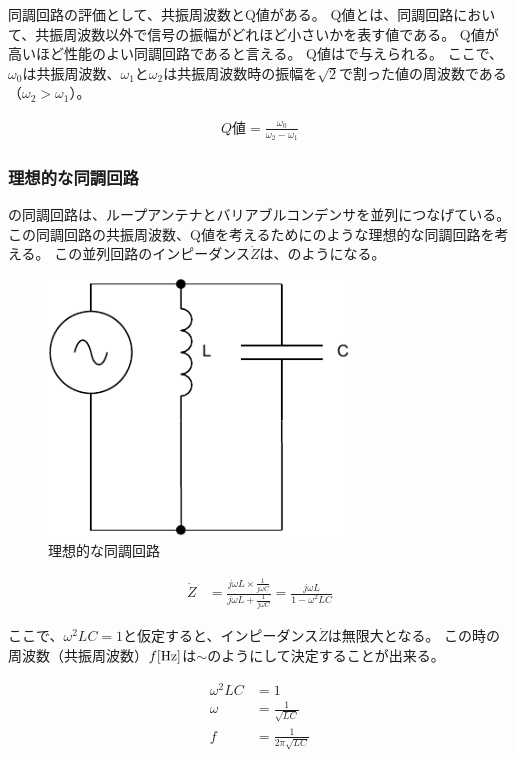 \documentclass[report.tex]{subfiles}
\begin{document}
同調回路の評価として、共振周波数とQ値がある。
Q値とは、同調回路において、共振周波数以外で信号の振幅がどれほど小さいかを表す値である。
Q値が高いほど性能のよい同調回路であると言える。
Q値はで与えられる\cite{ノート}。
ここで、\(\omega_0\)は共振周波数、\(\omega_1\)と\(\omega_2\)は共振周波数時の振幅を\(\sqrt{2}\)で割った値の周波数である（\(\omega_2 > \omega_1\)）。

\begin{align}
	Q値 =\frac{\omega_0}{\omega_2 - \omega_1} \label{eq:Q値}
\end{align}

\subsubsection{理想的な同調回路}

の同調回路は、ループアンテナとバリアブルコンデンサを並列につなげている。
この同調回路の共振周波数、Q値を考えるためにのような理想的な同調回路を考える。
この並列回路のインピーダンス\(\dot{Z}\)は、のようになる。

\begin{figure}[H]
	\centering
	\includegraphics[width=8cm]{fig/kyo.pdf}
	\caption{理想的な同調回路}
	\label{fig:kyo}
\end{figure}

\begin{align}
	\dot{Z} & = \frac{j \omega L \times \frac{1}{j \omega C}}{j \omega L + \frac{1}{j \omega C}} = \frac{j \omega L}{1 - \omega^2 LC} \label{eq:impedance}
\end{align}

ここで、$\omega^2 LC = 1$と仮定すると、インピーダンス\(\dot{Z}\)は無限大となる。
この時の周波数（共振周波数）\(f\rm{[Hz]}\)は\(\sim\)のようにして決定することが出来る。

\begin{align}
	\omega^2 LC & = 1                            \label{eq:resonance2} \\
	\omega      & = \frac{1}{\sqrt{LC}}                                \\
	f           & = \frac{1}{2 \pi \sqrt{LC}} \label{eq:resonance}
\end{align}
\end{document}
